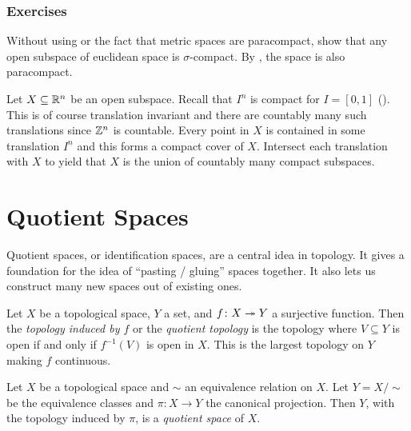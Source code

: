 \documentclass[letterpaper, 11pt, oneside]{book}
\begin{document}
\clearpage

\subsection*{Exercises}

\begin{exercise}
  Without using  or the fact that metric spaces are paracompact, show that any open subspace of euclidean space is $\sigma$-compact.
  By , the space is also paracompact.
\end{exercise}
\begin{pf}
  Let $X \subseteq \mathbb{R}^{n}$ be an open subspace.
  Recall that $I^{n}$ is compact for $I = [0, 1]$ ().
  This is of course translation invariant and there are countably many such translations since $\mathbb{Z}^{n}$ is countable.
  Every point in $X$ is contained in some translation $I^{n}$ and this forms a compact cover of $X$.
  Intersect each translation with $X$ to yield that $X$ is the union of countably many compact subspaces.
\end{pf}

\clearpage

\chapter{Quotient Spaces}

Quotient spaces, or identification spaces, are a central idea in topology.
It gives a foundation for the idea of ``pasting / gluing'' spaces together.
It also lets us construct many new spaces out of existing ones.

\begin{defn}
  Let $X$ be a topological space, $Y$ a set, and $f\colon X \onto Y$ a surjective function.
  Then the \emph{topology induced by $f$} or the \emph{quotient topology} is the topology where $V \subseteq Y$ is open if and only if $f^{-1}(V)$ is open in $X$.
  This is the largest topology on $Y$ making $f$ continuous.
\end{defn}

\begin{defn}
  Let $X$ be a topological space and $\sim$ an equivalence relation on $X$.
  Let $Y = X / \sim$ be the equivalence classes and $\pi\colon X \to Y$ the canonical projection.
  Then $Y$, with the topology induced by $\pi$, is a \emph{quotient space} of $X$.
\end{defn}
\end{document}
